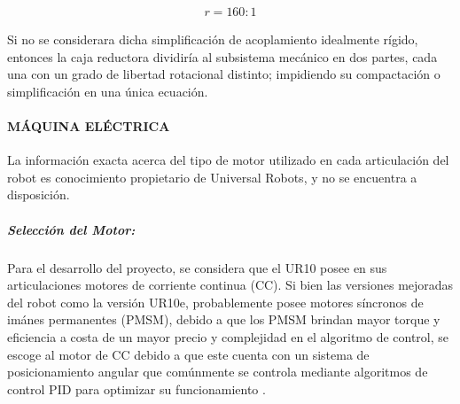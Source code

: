 \documentclass{article}
\begin{document}
\begin{sloppypar}
\begin{align} \label{eq:Valor de r}
	r = 160\text{}{:}1
\end{align}

Si no se considerara dicha simplificación de acoplamiento idealmente rígido, entonces la caja reductora dividiría al subsistema mecánico en dos partes, cada una con un grado de libertad rotacional distinto; impidiendo su compactación o simplificación en una única ecuación.


\paragraph{MÁQUINA ELÉCTRICA}
\label{sec:MÁQUINA ELÉCTRICA}
\hfill

\hfill


La información exacta acerca del tipo de motor utilizado en cada articulación del robot es conocimiento propietario de Universal Robots, y no se encuentra a disposición.

\subparagraph{Selección del Motor:}
\label{sec:Selección del Motor:}
\hfill

\hfill

Para el desarrollo del proyecto, se considera que el UR10 posee en sus articulaciones motores de corriente continua (CC). Si bien las versiones mejoradas del robot como la versión UR10e, probablemente posee motores síncronos de imánes permanentes (PMSM), debido a que los PMSM brindan mayor torque y eficiencia a costa de un mayor precio y complejidad en el algoritmo de control, se escoge al motor de CC debido a que este cuenta con un sistema de posicionamiento angular que comúnmente se controla mediante algoritmos de control PID para optimizar su funcionamiento \cite{arenas2023virtual}.


\end{sloppypar}
\end{document}
